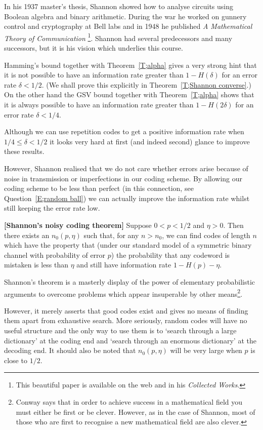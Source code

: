 In his 1937 master's thesis, Shannon showed how to
analyse circuits using Boolean algebra and binary arithmetic.
During the war he worked on gunnery control
and cryptography at Bell labs and in 1948 he published
\emph{A Mathematical Theory of Communication}%
\footnote{This beautiful paper is available on the web
and in his \emph{Collected Works}.}.
Shannon had several predecessors and many successors,
but it is his vision which underlies this course.

Hamming's bound together with
Theorem~\ref{T;alpha} 
gives a very strong hint that it is not possible to
have an information rate greater than 
$1-H(\delta)$ for an error rate $\delta<1/2$.
(We shall prove this explicitly in Theorem~\ref{T;Shannon converse}.)
On the other hand  the GSV bound
together with
Theorem~\ref{T;alpha} 
shows that it is always possible to
have an information rate greater than 
$1-H(2\delta)$ for an error rate $\delta<1/4$.

Although we can use repetition codes
to get a positive information rate
when $1/4\leq \delta<1/2$ it looks
very hard at first (and indeed second) glance
to improve these results. 

However, Shannon realised that 
we do not care whether errors arise because
of noise in transmission or imperfections
in our coding scheme. By allowing our coding 
scheme to be less than perfect 
(in this connection, see Question~\ref{E;random ball})
we can 
actually improve the information rate whilst
still keeping the error rate low.
\begin{theorem}{\bf [Shannon's noisy coding theorem]}\label{T;Shannon}
Suppose $0<p<1/2$ and $\eta>0$.
Then there exists an $n_{0}(p,\eta)$ such that,
for any $n>n_{0}$, we can find codes of
length $n$ which have the property
that (under our standard model
of  a symmetric binary
channel with probability of error $p$) the probability
that any codeword is mistaken is less than
$\eta$ and still have
information rate $1-H(p)-\eta$.
\end{theorem}
Shannon's theorem is a masterly display
of the power of elementary probabilistic
arguments to overcome problems
which appear insuperable by other 
means\footnote{Conway says that in order to
achieve success in a mathematical field
you must either be first or be clever.
However, as in the case of Shannon,
most of those who are first
to recognise a new mathematical field
are also clever.}.

However, it merely asserts that good codes
exist and gives no means of finding
them apart from exhaustive search.
More seriously, random codes will have
no useful structure and the only way to use them
is to `search through a large dictionary'
at the coding end and
`search through an enormous dictionary'
at the decoding end. 
It should also be noted that  $n_{0}(p,\eta)$
will be very large when $p$ is close to $1/2$.

